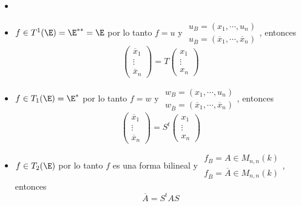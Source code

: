 \hfill
\begin{example}
    \begin{itemize}
        \item[]
        \item
            $ f \in T^1(\E) = \E^{**} = \E $ por lo tanto $ f = u $ y $
            \substack{ u_B = (x_1, \cdots, u_n) \\
            u_{\overline{B}} = (\overline{x}_1, \cdots, \overline{x}_n)}
            $, entonces
            \[
                \begin{pmatrix}
                    \overline{x}_1 \\
                    \vdots \\
                    \overline{x}_n
                \end{pmatrix}
                = T
                \begin{pmatrix}
                    x_1 \\
                    \vdots \\
                    x_n
                \end{pmatrix}
            \]
        \item
            $ f \in T_1(\E) = \E^* $ por lo tanto $ f = w $ y $
            \substack{ w_B = (x_1, \cdots, u_n) \\
            w_{\overline{B}} = (\overline{x}_1, \cdots, \overline{x}_n)}
            $, entonces
            \[
                \begin{pmatrix}
                    \overline{x}_1 \\
                    \vdots \\
                    \overline{x}_n
                \end{pmatrix}
                = S^t
                \begin{pmatrix}
                    x_1 \\
                    \vdots \\
                    x_n
                \end{pmatrix}
            \]
        \item
            $ f \in T_2(\E) $ por lo tanto $ f $ es una forma bilineal y
            $ \substack{ f_B = A \in M_{n,n}(k) \\
            f_{\overline{B}} = \overline{A} \in M_{n,n}(k)} $, entonces
            \[
                \overline{A} = S^tAS
            \]
    \end{itemize}
\end{example}

